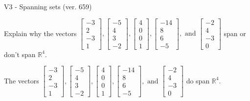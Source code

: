\begin{exercise}
  \begin{exerciseTitle}V3 - Spanning sets (ver. 659)\end{exerciseTitle}
  \begin{exerciseStatement}
    Explain why the vectors \(\left[\begin{array}{r}
-3 \\
2 \\
-3 \\
1
\end{array}\right] , \left[\begin{array}{r}
-5 \\
4 \\
3 \\
-2
\end{array}\right] , \left[\begin{array}{r}
4 \\
0 \\
0 \\
1
\end{array}\right] , \left[\begin{array}{r}
-14 \\
8 \\
6 \\
-5
\end{array}\right] , \text{ and } \left[\begin{array}{r}
-2 \\
4 \\
-3 \\
0
\end{array}\right]\) span or don't span \(\mathbb{R}^4\). 
	


  \end{exerciseStatement}
  \begin{exerciseAnswer}
   The vectors \(\left[\begin{array}{r}
-3 \\
2 \\
-3 \\
1
\end{array}\right] , \left[\begin{array}{r}
-5 \\
4 \\
3 \\
-2
\end{array}\right] , \left[\begin{array}{r}
4 \\
0 \\
0 \\
1
\end{array}\right] , \left[\begin{array}{r}
-14 \\
8 \\
6 \\
-5
\end{array}\right] , \text{ and } \left[\begin{array}{r}
-2 \\
4 \\
-3 \\
0
\end{array}\right]\) 
  	 do  
	span \(\mathbb{R}^4\).
  



\end{exerciseAnswer}
\end{exercise}

